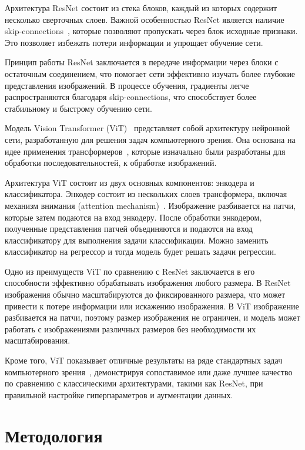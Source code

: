\documentclass[a4paper,12pt]{extarticle}
\begin{document}
Архитектура ResNet состоит из стека блоков, каждый из которых содержит несколько сверточных слоев. Важной особенностью ResNet является наличие skip-connections~\cite{wu2020skip}, которые позволяют пропускать через блок исходные признаки. Это позволяет избежать потери информации и упрощает обучение сети.

Принцип работы ResNet заключается в передаче информации через блоки с остаточным соединением, что помогает сети эффективно изучать более глубокие представления изображений. В процессе обучения, градиенты легче распространяются благодаря skip-connections, что способствует более стабильному и быстрому обучению сети.

Модель Vision Transformer (ViT)~\cite{dosovitskiy2021image} представляет собой архитектуру нейронной сети, разработанную для решения задач компьютерного зрения. Она основана на идее применения трансформеров~\cite{vaswani2023attention}, которые изначально были разработаны для обработки последовательностей, к обработке изображений.

Архитектура ViT состоит из двух основных компонентов: энкодера и классификатора. Энкодер состоит из нескольких слоев трансформера, включая механизм внимания (attention mechanism)~\cite{bahdanau2016neural}. Изображение разбивается на патчи, которые затем подаются на вход энкодеру. После обработки энкодером, полученные представления патчей объединяются и подаются на вход классификатору для выполнения задачи классификации. Можно заменить классификатор на регрессор и тогда модель будет решать задачи регрессии.

Одно из преимуществ ViT по сравнению с ResNet заключается в его способности эффективно обрабатывать изображения любого размера. В ResNet изображения обычно масштабируются до фиксированного размера, что может привести к потере информации или искажению изображения. В ViT изображение разбивается на патчи, поэтому размер изображения не ограничен, и модель может работать с изображениями различных размеров без необходимости их масштабирования.

Кроме того, ViT показывает отличные результаты на ряде стандартных задач компьютерного зрения~\cite{dosovitskiy2021image, benz2021adversarial}, демонстрируя сопоставимое или даже лучшее качество по сравнению с классическими архитектурами, такими как ResNet, при правильной настройке гиперпараметров и аугментации данных.

\section{Методология}
\label{section:method}
\end{document}
